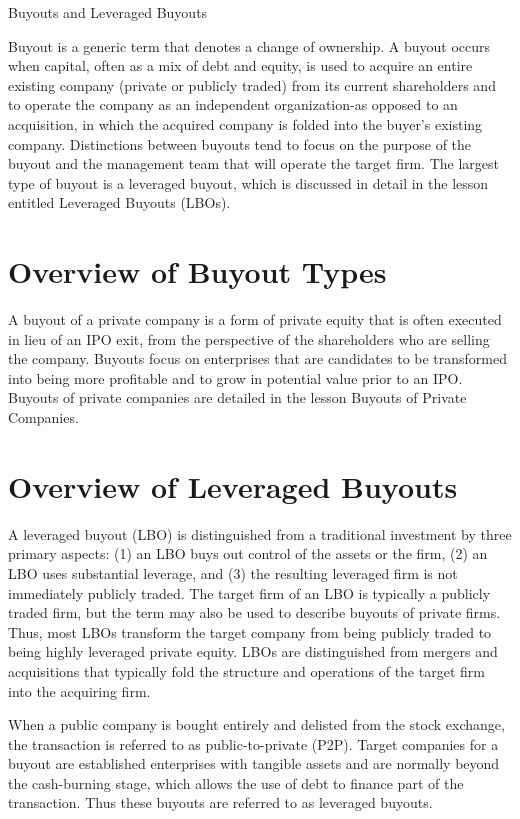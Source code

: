 \documentclass[11pt]{article}
\begin{document}
Buyouts and Leveraged Buyouts

Buyout is a generic term that denotes a change of ownership. A buyout occurs when capital, often as a mix of debt and equity, is used to acquire an entire existing company (private or publicly traded) from its current shareholders and to operate the company as an independent organization-as opposed to an acquisition, in which the acquired company is folded into the buyer's existing company. Distinctions between buyouts tend to focus on the purpose of the buyout and the management team that will operate the target firm. The largest type of buyout is a leveraged buyout, which is discussed in detail in the lesson entitled Leveraged Buyouts (LBOs).

\section*{Overview of Buyout Types}
A buyout of a private company is a form of private equity that is often executed in lieu of an IPO exit, from the perspective of the shareholders who are selling the company. Buyouts focus on enterprises that are candidates to be transformed into being more profitable and to grow in potential value prior to an IPO. Buyouts of private companies are detailed in the lesson Buyouts of Private Companies.

\section*{Overview of Leveraged Buyouts}
A leveraged buyout (LBO) is distinguished from a traditional investment by three primary aspects: (1) an LBO buys out control of the assets or the firm, (2) an LBO uses substantial leverage, and (3) the resulting leveraged firm is not immediately publicly traded. The target firm of an LBO is typically a publicly traded firm, but the term may also be used to describe buyouts of private firms. Thus, most LBOs transform the target company from being publicly traded to being highly leveraged private equity. LBOs are distinguished from mergers and acquisitions that typically fold the structure and operations of the target firm into the acquiring firm.

When a public company is bought entirely and delisted from the stock exchange, the transaction is referred to as public-to-private (P2P). Target companies for a buyout are established enterprises with tangible assets and are normally beyond the cash-burning stage, which allows the use of debt to finance part of the transaction. Thus these buyouts are referred to as leveraged buyouts.
\end{document}
